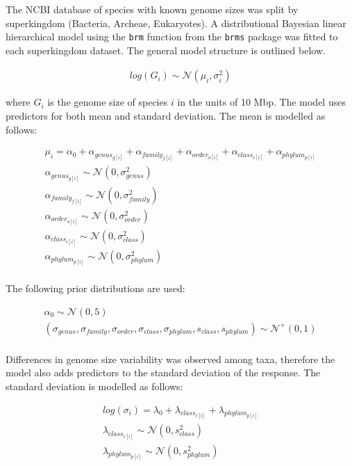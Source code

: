 \documentclass[
]{article}
\begin{document}
The NCBI database of species with known genome sizes was split by
superkingdom (Bacteria, Archeae, Eukaryotes). A distributional Bayesian
linear hierarchical model using the \texttt{brm} function from the
\texttt{brms} package was fitted to each superkingdom dataset. The
general model structure is outlined below.

\begin{gather*}
log(G_i) \sim \mathcal{N}(\mu_i, \sigma_{i}^2)
\end{gather*}

where \(G_i\) is the genome size of species \(i\) in the units of 10
Mbp. The model uses predictors for both mean and standard deviation. The
mean is modelled as follows:

\begin{gather*}
\mu_i = \alpha_0 + \alpha_{genus_{g[i]}} + \alpha_{family_{f[i]}} + \alpha_{order_{o[i]}} + \alpha_{class_{c[i]}} + \alpha_{phylum_{p[i]}}  \\
\alpha_{genus_{g[i]}} \sim \mathcal{N}(0, \sigma_{genus}^2) \\
\alpha_{family_{f[i]}} \sim \mathcal{N}(0, \sigma_{family}^2) \\
\alpha_{order_{o[i]}} \sim \mathcal{N}(0, \sigma_{order}^2) \\
\alpha_{class_{c[i]}} \sim \mathcal{N}(0, \sigma_{class}^2) \\
\alpha_{phylum_{p[i]}} \sim \mathcal{N}(0, \sigma_{phylum}^2) \\
\end{gather*}

The following prior distributions are used:

\begin{gather*}
\alpha_0 \sim \mathcal{N}(0,5) \\
(\sigma_{genus},\sigma_{family},\sigma_{order},\sigma_{class},\sigma_{phylum},s_{class},s_{phylum}) \sim \mathcal{N}^+(0,1) \\
\end{gather*}

Differences in genome size variability was observed among taxa,
therefore the model also adds predictors to the standard deviation of
the response. The standard deviation is modelled as follows:

\begin{gather*}
log(\sigma_{i}) = \lambda_0 + \lambda_{class_{c[i]}} + \lambda_{phylum_{p[i]}} \\
\lambda_{class_{c[i]}} \sim \mathcal{N}(0, s_{class}^2) \\
\lambda_{phylum_{p[i]}} \sim \mathcal{N}(0, s_{phylum}^2) \\
\end{gather*}
\end{document}
